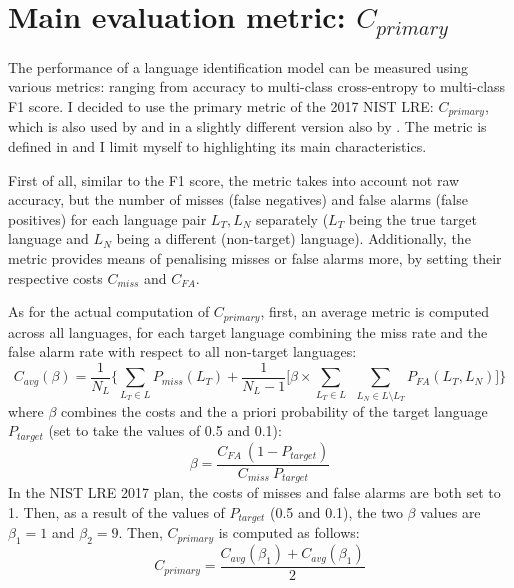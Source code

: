 \documentclass[bsc,frontabs,twoside,singlespacing,parskip,deptreport]{infthesis}
\begin{document}
{  \section{Main evaluation metric: $C_{primary}$}{
    \label{sec:c-primary}
    The performance of a language identification model can be measured using various metrics: ranging from accuracy to multi-class cross-entropy to multi-class F1 score. I decided to use the primary metric of the 2017 NIST LRE: $C_{primary}$, which is also used by \citet{Snyder_et_al_2018} and in a slightly different version also by \citet{Martinez_et_al_2012}. The metric is defined in \citet{LRE_2017} and I limit myself to highlighting its main characteristics.

    First of all, similar to the F1 score, the metric takes into account not raw accuracy, but the number of misses (false negatives) and false alarms (false positives) for each language pair $L_T, L_N$ separately ($L_T$ being the true target language and $L_N$ being a different (non-target) language). Additionally, the metric provides means of penalising misses or false alarms more, by setting their respective costs $C_{miss}$ and $C_{FA}$.

    As for the actual computation of $C_{primary}$, first, an average metric is computed across all languages, for each target language combining the miss rate and the false alarm rate with respect to all non-target languages:
    \begin{equation}
      \label{eq:c-avg}
      C_{avg}(\beta) = \frac{1}{N_L} \bigg\{ \sum_{L_T \in L} P_{miss}(L_T) + \frac{1}{N_L - 1}\Big[ \beta \times \sum_{L_T \in L} \ \ \sum_{L_N \in L \setminus L_T} P_{FA}(L_T, L_N) \Big] \bigg\}
    \end{equation}
    where $\beta$ combines the costs and the a priori probability of the target language $P_{target}$ (set to take the values of 0.5 and 0.1):
    \begin{equation}
      \label{eq:beta}
      \beta = \frac{C_{FA}\ (1 - P_{target})}{C_{miss}\ P_{target}}
    \end{equation}
    In the NIST LRE 2017 plan, the costs of misses and false alarms are both set to 1. Then, as a result of the values of $P_{target}$ (0.5 and 0.1), the two $\beta$ values are $\beta_1 = 1$ and $\beta_2=9$. Then, $C_{primary}$ is computed as follows:
    \begin{equation}
      \label{eq:c-prim-final}
      C_{primary} = \frac{C_{avg}(\beta_1) + C_{avg}(\beta_1)}{2}
    \end{equation}
  }
}
\end{document}
